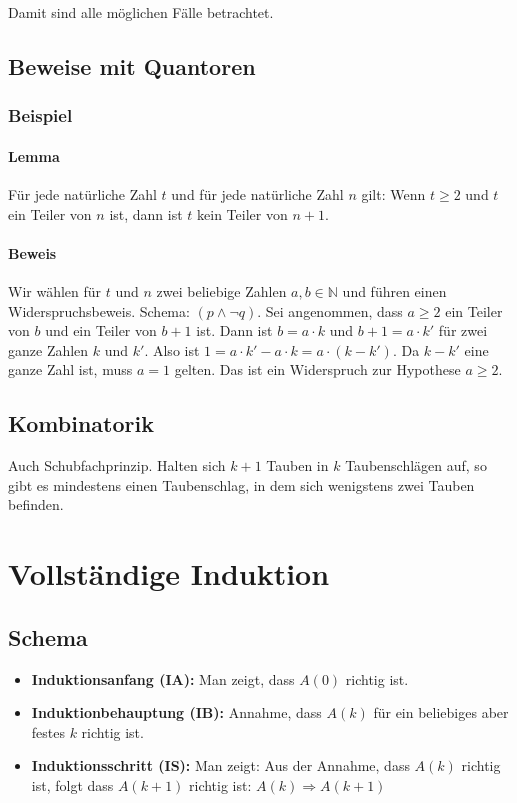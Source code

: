 \documentclass[10pt,a4paper,twoside,twocolumn]{article}
\begin{document}
	Damit sind alle möglichen Fälle betrachtet.
	
	\subsection{Beweise mit Quantoren}
	
	\subsubsection{Beispiel}
	
	\paragraph{Lemma} Für jede natürliche Zahl $ t $ und für jede natürliche Zahl $ n $ gilt: Wenn $ t \geq 2 $ und $ t $ ein Teiler von $ n $ ist, dann ist $ t $ kein Teiler von $ n + 1 $.
	
	\paragraph{Beweis} Wir wählen für $ t $ und $ n $ zwei beliebige Zahlen $ a, b \in \mathbb{N} $ und führen einen Widerspruchsbeweis. Schema: $ (p \land \neg q) $. Sei angenommen, dass $ a \geq 2 $ ein Teiler von $ b $ und ein Teiler von $ b + 1 $ ist. Dann ist $ b = a \cdot k $ und $ b + 1 = a \cdot k' $ für zwei ganze Zahlen $ k $ und $  k' $. Also ist $ 1 = a \cdot k' - a \cdot k = a \cdot (k - k') $. Da $ k - k' $ eine ganze Zahl ist, muss $ a = 1 $ gelten. Das ist ein Widerspruch zur Hypothese $ a \geq 2 $.
	
	\subsection{Kombinatorik}
	
	Auch Schubfachprinzip. Halten sich $ k + 1 $ Tauben in $ k $ Taubenschlägen auf, so gibt es mindestens einen Taubenschlag, in dem sich wenigstens zwei Tauben befinden.
	
	\section{Vollständige Induktion}
	
	\subsection{Schema}
	\begin{itemize}
		\setlength\itemsep{0em}
		\item \textbf{Induktionsanfang (IA):} Man zeigt, dass $ A(0) $ richtig ist.
		\item \textbf{Induktionbehauptung (IB):} Annahme, dass $ A(k) $ für ein beliebiges aber festes $ k $ richtig ist.
		\item \textbf{Induktionsschritt (IS):} Man zeigt: Aus der Annahme, dass $ A(k) $ richtig ist, folgt dass $ A(k + 1) $ richtig ist: $ A(k) \Rightarrow A(k + 1) $
	\end{itemize}
\end{document}
